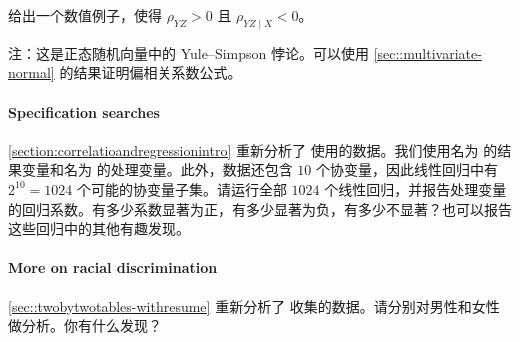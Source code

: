 给出一个数值例子，使得 $\rho_{YZ}>0$ 且 $\rho_{YZ\mid X}<0$。

注：这是正态随机向量中的 Yule--Simpson 悖论。可以使用 \cref{sec::multivariate-normal} 的结果证明偏相关系数公式。

\paragraph{Specification searches}\label{hw::lalonde-obs-reg}

\cref{section:correlatioandregressionintro} 重新分析了 \citet{hainmueller2012entropy} 使用的数据。我们使用名为  的结果变量和名为  的处理变量。此外，数据还包含 $10$ 个协变量，因此线性回归中有 $2^{10}=1024$ 个可能的协变量子集。请运行全部 $1024$ 个线性回归，并报告处理变量的回归系数。有多少系数显著为正，有多少显著为负，有多少不显著？也可以报告这些回归中的其他有趣发现。

\paragraph{More on racial discrimination}

\cref{sec::twobytwotables-withresume} 重新分析了 \citet{bertrand2004emily} 收集的数据。请分别对男性和女性做分析。你有什么发现？
